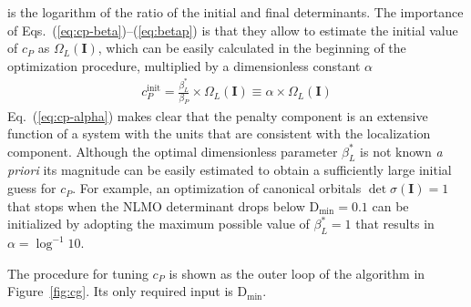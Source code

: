 \documentclass[aps,prl,reprint,amsmath,amssymb]{revtex4-1}
\begin{document}
%
is the logarithm of the ratio of the initial and final determinants. 
The importance of Eqs.~(\ref{eq:cp-beta})--(\ref{eq:betap}) is that they allow to estimate the initial value of $c_P$ as $\Omega_L(\mathbf{I})$, which can be easily calculated in the beginning of the optimization procedure, multiplied by a dimensionless constant $\alpha$
%
\begin{equation} \label{eq:cp-alpha}
\begin{split}
c_{P}^{\text{init}} = \frac{ \beta_L^{\ast} }{ \beta_P } \times \Omega_L(\mathbf{I}) \equiv \alpha \times \Omega_L(\mathbf{I})
\end{split}
\end{equation}
%
Eq.~(\ref{eq:cp-alpha}) makes clear that the penalty component is an extensive function of a system with the units that are consistent with the localization component. Although the optimal dimensionless parameter $\beta_L^{\ast}$ is not known \emph{a priori} its magnitude can be easily estimated to obtain a sufficiently large initial guess for $c_P$. For example, an optimization of canonical orbitals $\det \sigma(\mathbf{I})=1$ that stops when the NLMO determinant drops below $\text{D}_{\text{min}} = 0.1$ can be initialized by adopting the maximum possible value of $\beta_L^{\ast} = 1$ that results in $\alpha = \log^{-1} 10$.

The procedure for tuning $c_P$ is shown as the outer loop of the algorithm in Figure~\ref{fig:cg}. Its only required input is $\text{D}_{\text{min}}$. %



\end{document}
